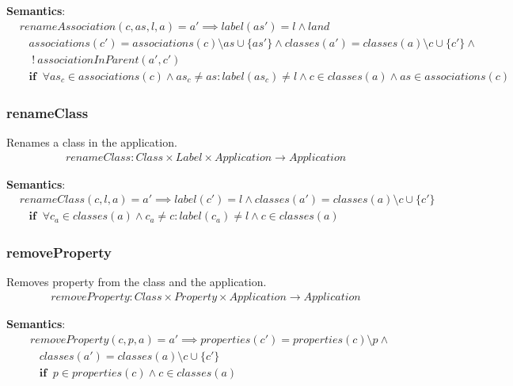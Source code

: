\documentclass[10pt]{article}
\begin{document}
\noindent \textbf{Semantics}:
\begin{align}
& renameAssociation(c, as, l, a) = a' \implies  label(as') = l  \land land \nonumber \\
& \;\;\; associations(c') = associations(c) \setminus as \cup \{ as' \} \land classes(a') = classes(a) \setminus c  \cup \{c'\} \land \nonumber \\
& \;\;\; \; ! \: associationInParent(a', c') \nonumber \\
& \;\;\; \mathbf{if} \;\; \forall as_c \in associations(c) \land as_c \neq as : label(as_c) \neq l \land c \in classes(a) \land as \in associations(c)
\end{align}

\subsubsection{renameClass}
Renames a class in the application.
\begin{align}
renameClass: Class \times Label \times Application \rightarrow Application
\end{align}

\noindent \textbf{Semantics}:
\begin{align}
& renameClass(c, l, a) = a' \implies label(c') = l \land classes(a') = classes(a) \setminus c  \cup \{c'\} \nonumber \\
& \;\;\; \mathbf{if} \;\; \forall c_a \in classes(a) \land c_a \neq c: label(c_a) \neq l  \land c \in classes(a)
\end{align}

\subsubsection{removeProperty}
Removes property from the class and the application.
\begin{align}
removeProperty: Class \times Property \times Application \rightarrow Application
\end{align}

\noindent \textbf{Semantics}:
\begin{align}
& removeProperty(c, p, a) = a' \implies properties(c') = properties(c) \setminus p   \land \nonumber \\
& \;\;\; classes(a') = classes(a) \setminus c  \cup \{c'\}  \nonumber \\
& \;\;\; \mathbf{if} \;\; p \in properties(c) \land c \in classes(a)
\end{align}
\end{document}
